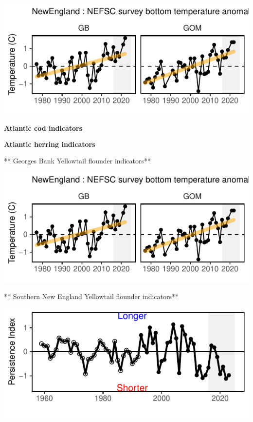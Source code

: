 \documentclass[
  10pt,
]{article}
\begin{document}
\begin{center}\includegraphics{NE_RiskPolicy_2025_DRAFT_files/figure-latex/plaice_eco-1} \end{center}

\textbf{Atlantic cod indicators}

\textbf{Atlantic herring indicators}

** Georges Bank Yellowtail flounder indicators**

\begin{center}\includegraphics{NE_RiskPolicy_2025_DRAFT_files/figure-latex/gb_yt_eco-1} \end{center}

** Southern New England Yellowtail flounder indicators**

\begin{center}\includegraphics{NE_RiskPolicy_2025_DRAFT_files/figure-latex/sne_yt_eco-1} \end{center}
\end{document}
